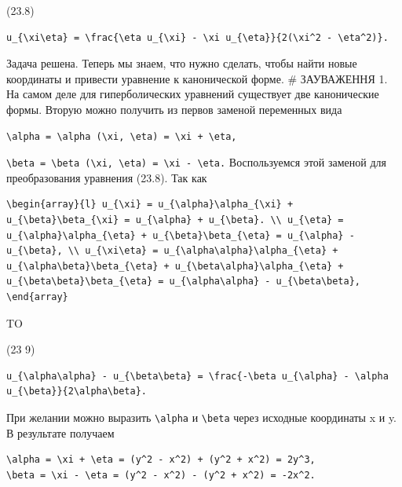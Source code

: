 \documentclass[
  ukrainian,
]{article}
\begin{document}
(23.8)

\begin{verbatim}
u_{\xi\eta} = \frac{\eta u_{\xi} - \xi u_{\eta}}{2(\xi^2 - \eta^2)}.
\end{verbatim}

Задача решена. Теперь мы знаем, что нужно сделать, чтобы найти новые
координаты и привести уравнение к канонической форме. \# ЗАУВАЖЕННЯ 1.
На самом деле для гиперболических уравнений существует две канонические
формы. Вторую можно получить из первов заменой переменных вида

\begin{verbatim}
\alpha = \alpha (\xi, \eta) = \xi + \eta,
\end{verbatim}

\texttt{\textbackslash{}beta\ =\ \textbackslash{}beta\ (\textbackslash{}xi,\ \textbackslash{}eta)\ =\ \textbackslash{}xi\ -\ \textbackslash{}eta.}
Воспользуемся этой заменой для преобразования уравнения (23.8). Так как

\begin{verbatim}
\begin{array}{l} u_{\xi} = u_{\alpha}\alpha_{\xi} + u_{\beta}\beta_{\xi} = u_{\alpha} + u_{\beta}. \\ u_{\eta} = u_{\alpha}\alpha_{\eta} + u_{\beta}\beta_{\eta} = u_{\alpha} - u_{\beta}, \\ u_{\xi\eta} = u_{\alpha\alpha}\alpha_{\eta} + u_{\alpha\beta}\beta_{\eta} + u_{\beta\alpha}\alpha_{\eta} + u_{\beta\beta}\beta_{\eta} = u_{\alpha\alpha} - u_{\beta\beta}, \end{array}
\end{verbatim}

TO

(23 9)

\begin{verbatim}
u_{\alpha\alpha} - u_{\beta\beta} = \frac{-\beta u_{\alpha} - \alpha u_{\beta}}{2\alpha\beta}.
\end{verbatim}

При желании можно выразить \texttt{\textbackslash{}alpha} и
\texttt{\textbackslash{}beta} через исходные координаты x и y. В
результате получаем

\begin{verbatim}
\alpha = \xi + \eta = (y^2 - x^2) + (y^2 + x^2) = 2y^3,
\beta = \xi - \eta = (y^2 - x^2) - (y^2 + x^2) = -2x^2.
\end{verbatim}
\end{document}
